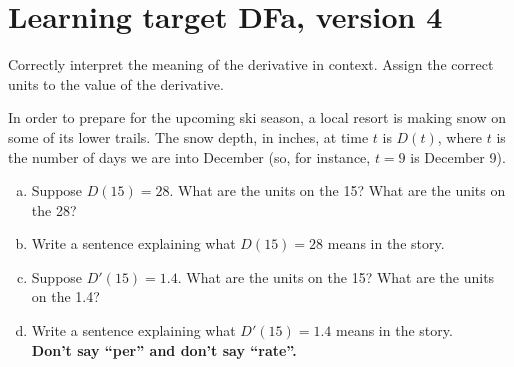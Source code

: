 \pagebreak

\section{Learning target DFa, version 4}

Correctly interpret the meaning of the derivative in context. Assign the correct units to the value of the derivative.

\hrulefill

In order to prepare for the upcoming ski season, a local resort is making snow on some of its lower trails. The snow depth, in inches, at time $t$ is $D(t)$, where $t$ is the number of days we are into December (so, for instance, $t=9$ is December 9). 

\begin{enumerate}[(a)]
\item Suppose $D(15)=28$. What are the units on the 15? What are the units on the 28?
\vfill
\item Write a sentence explaining what $D(15)=28$ means in the story.
\vfill

\item Suppose $D'(15) = 1.4$. What are the units on the 15? What are the units on the 1.4?
\vfill
\item Write a sentence explaining what $D'(15) = 1.4$ means in the story.\\
\textbf{Don't say ``per'' and don't say ``rate''.}

\vfill
\end{enumerate}

